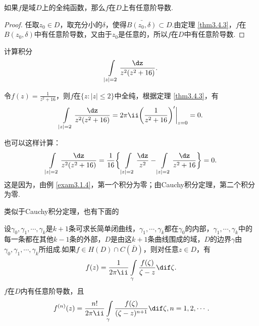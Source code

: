 \begin{theorem}\label{thm3.4.4}
如果$f$是域$D$上的全纯函数，那么$f$在$D$上有任意阶导数.
\end{theorem}
\begin{proof}
任取$z_0\in D$，取充分小的$\delta$，使得$\bar{B(z_0,\delta)}\subset D$.由定理 \ref{thm3.4.3}，$f$在$B(z_0,\delta)$中有任意阶导数，又由于$z_0$是任意的，所以$f$在$D$中有任意阶导数.
\end{proof}

\begin{example}\label{exam3.4.5}
计算积分
\[\int\limits_{|z|=2}\frac{\dz}{z^2(z^2+16)}.\]
\end{example}
\begin{solution}
令$f(z)=\frac1{z^2+16}$，则$f$在$\{z:|z|\le2\}$中全纯，根据定理 \ref{thm3.4.3}，有
\[\int\limits_{|z|=2}\frac{\dz}{z^2(z^2+16)}=2\pi\ii
\bigg(\frac1{z^2+16}\bigg)'\bigg|_{z=0}=0.\]

也可以这样计算：
\[\int\limits_{|z|=2}\frac{\dz}{z^2(z^2+16)}=\frac1{16}
\bigg\{\int\limits_{|z|=2}\frac{\dz}{z^2}-\int\limits_{|z|=2}\frac{\dz}{z^2+16}\bigg\}=0.\]
这是因为，由例 \ref{exam3.1.4}，第一个积分为零；由Cauchy积分定理，第二个积分为零.
\end{solution}

类似于Cauchy积分定理，也有下面的
\begin{theorem}\label{thm3.4.6}
  设$\gamma_0,\gamma_1,\cdots,\gamma_k$是$k+1$条可求长简单闭曲线，$\gamma_1,\cdots,\gamma_k$都在$\gamma_0$的内部，$\gamma_1,\cdots,\gamma_k$中的每一条都在其他$k-1$条的外部，$D$是由这$k+1$条曲线围成的域，$D$的边界$\gamma$由$\gamma_0,\gamma_1,\cdots,\gamma_k$所组成.如果$f\in H(D)\cap C(\bar D)$，则对任意$z\in D$，有
  \[f(z)=\frac1{2\pi\ii}\int\limits_{\gamma}\frac{f(\zeta)}{\zeta-z}\dif \zeta.\]
$f$在$D$内有任意阶导数，且
\[f^{(n)}(z)=\frac{n!}{2\pi\ii}\int\limits_\gamma\frac{f(\zeta)}{(\zeta-z)^{n+1}}\dif \zeta,n=1,2,\cdots.\]
\end{theorem}

